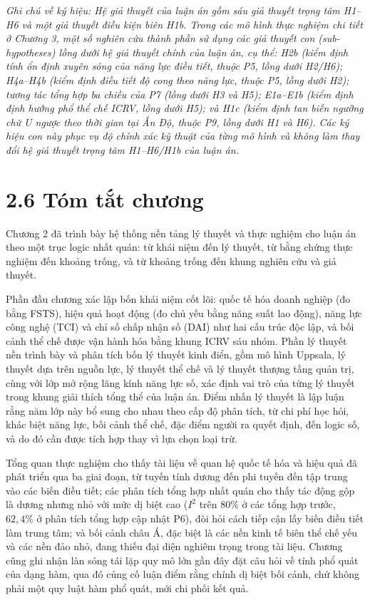 \documentclass[
  a4paper,
  13pt]{extreport}
\begin{document}
\emph{Ghi chú về ký hiệu: Hệ giả thuyết của luận án gồm sáu giả thuyết
trọng tâm H1--H6 và một giả thuyết điều kiện biên H1b. Trong các mô hình
thực nghiệm chi tiết ở Chương 3, một số nghiên cứu thành phần sử dụng
các giả thuyết con (sub-hypotheses) lồng dưới hệ giả thuyết chính của
luận án, cụ thể: H2b (kiểm định tính ổn định xuyên sóng của năng lực
điều tiết, thuộc P5, lồng dưới H2/H6); H4a--H4b (kiểm định điều tiết độ
cong theo năng lực, thuộc P5, lồng dưới H2); tương tác tổng hợp ba chiều
của P7 (lồng dưới H3 và H5); E1a--E1b (kiểm định định hướng phổ thể chế
ICRV, lồng dưới H5); và H1c (kiểm định tan biến ngưỡng chữ U ngược theo
thời gian tại Ấn Độ, thuộc P9, lồng dưới H1 và H6). Các ký hiệu con này
phục vụ độ chính xác kỹ thuật của từng mô hình và không làm thay đổi hệ
giả thuyết trọng tâm H1--H6/H1b của luận án.}

\hypertarget{tuxf3m-tux1eaft-chux1b0ux1a1ng}{%
\section{2.6 Tóm tắt chương}\label{tuxf3m-tux1eaft-chux1b0ux1a1ng}}

Chương 2 đã trình bày hệ thống nền tảng lý thuyết và thực nghiệm cho
luận án theo một trục logic nhất quán: từ khái niệm đến lý thuyết, từ
bằng chứng thực nghiệm đến khoảng trống, và từ khoảng trống đến khung
nghiên cứu và giả thuyết.

Phần đầu chương xác lập bốn khái niệm cốt lõi: quốc tế hóa doanh nghiệp
(đo bằng FSTS), hiệu quả hoạt động (đo chủ yếu bằng năng suất lao động),
năng lực công nghệ (TCI) và chỉ số chấp nhận số (DAI) như hai cấu trúc
độc lập, và bối cảnh thể chế được vận hành hóa bằng khung ICRV sáu nhóm.
Phần lý thuyết nền trình bày và phân tích bốn lý thuyết kinh điển, gồm
mô hình Uppsala, lý thuyết dựa trên nguồn lực, lý thuyết thể chế và lý
thuyết thượng tầng quản trị, cùng với lớp mở rộng lăng kính năng lực số,
xác định vai trò của từng lý thuyết trong khung giải thích tổng thể của
luận án. Điểm nhấn lý thuyết là lập luận rằng năm lớp này bổ sung cho
nhau theo cấp độ phân tích, từ chi phí học hỏi, khác biệt năng lực, bối
cảnh thể chế, đặc điểm người ra quyết định, đến logic số, và do đó cần
được tích hợp thay vì lựa chọn loại trừ.

Tổng quan thực nghiệm cho thấy tài liệu về quan hệ quốc tế hóa và hiệu
quả đã phát triển qua ba giai đoạn, từ tuyến tính dương đến phi tuyến
đến tập trung vào các biến điều tiết; các phân tích tổng hợp nhất quán
cho thấy tác động gộp là dương nhưng nhỏ với mức dị biệt cao (\(I^2\)
trên 80\% ở các tổng hợp trước, \(62{,}4\%\) ở phân tích tổng hợp cập
nhật P6), đòi hỏi cách tiếp cận lấy biến điều tiết làm trung tâm; và bối
cảnh châu Á, đặc biệt là các nền kinh tế biên thể chế yếu và các nền đảo
nhỏ, đang thiếu đại diện nghiêm trọng trong tài liệu. Chương cũng ghi
nhận làn sóng tái lặp quy mô lớn gần đây đặt câu hỏi về tính phổ quát
của dạng hàm, qua đó củng cố luận điểm rằng chính dị biệt bối cảnh, chứ
không phải một quy luật hàm phổ quát, mới chi phối kết quả.
\end{document}
